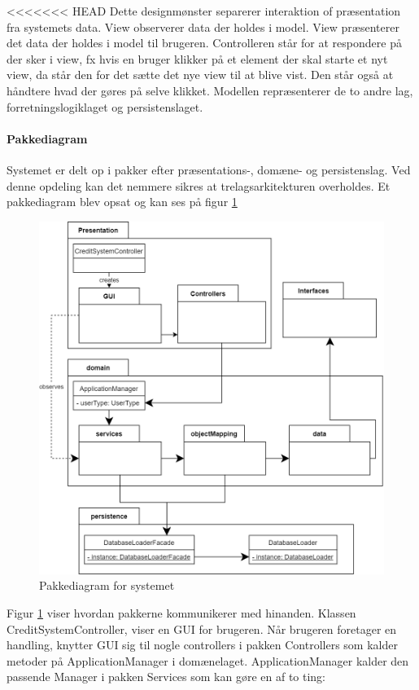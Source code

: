<<<<<<< HEAD
Dette designmønster separerer interaktion of præsentation fra systemets data.
View observerer data der holdes i model. View præsenterer det data der holdes i
model til brugeren. Controlleren står for at respondere på der sker i view, fx
hvis en bruger klikker på et element der skal starte et nyt view, da står den
for det sætte det nye view til at blive vist. Den står også at håndtere hvad der
gøres på selve klikket. 
Modellen repræsenterer de to andre lag, forretningslogiklaget og persistenslaget.
\paragraph{Pakkediagram} Systemet er delt op i pakker efter præsentations-, domæne- og persistenslag. Ved denne opdeling kan det nemmere sikres at trelagsarkitekturen overholdes. Et pakkediagram blev opsat og kan ses på figur \ref{fig:PackageDiagram}

\begin{figure}[H]
    \centering
\includegraphics[scale = 0.3]{images/PackageDiagram.png}
    \caption{Pakkediagram for systemet}
    \label{fig:PackageDiagram}
\end{figure}

Figur \ref{fig:PackageDiagram} viser hvordan pakkerne kommunikerer med hinanden. Klassen CreditSystemController, viser en GUI for brugeren. Når brugeren foretager en handling, knytter GUI sig til nogle controllers i pakken Controllers som kalder metoder på ApplicationManager i domænelaget. ApplicationManager kalder den passende Manager i pakken Services som kan gøre en af to ting: 

